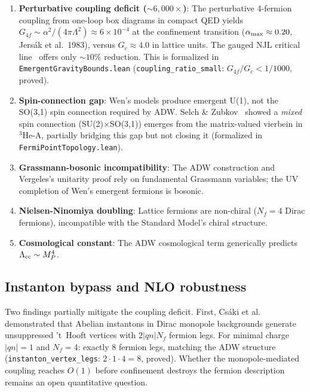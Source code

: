\documentclass[aps,prd,twocolumn,superscriptaddress,nofootinbib]{revtex4-2}
\begin{document}
\begin{enumerate}
\item \textbf{Perturbative coupling deficit (${\sim}6{,}000\times$)}: The
  perturbative 4-fermion coupling from one-loop box diagrams in compact QED
  yields $G_{4f} \sim \alpha^2/(4\pi\Lambda^2) \approx 6 \times 10^{-4}$ at
  the confinement transition ($\alpha_{\rm max} \approx 0.20$,
  Jersák et al.~1983), versus $G_c \approx 4.0$ in lattice units. The gauged
  NJL critical line~\cite{Kondo1989} offers only ${\sim}10\%$ reduction. This is
  formalized in \texttt{EmergentGravityBounds.lean} (\texttt{coupling\_ratio\_small}:
  $G_{4f}/G_c < 1/1000$, proved).

\item \textbf{Spin-connection gap}: Wen's models produce emergent U(1),
  not the SO(3,1) spin connection required by ADW. Selch \& Zubkov~\cite{Selch2025}
  showed a \emph{mixed} spin connection (SU(2)$\times$SO(3,1)) emerges from the
  matrix-valued vierbein in $^3$He-A, partially bridging this gap but not closing it
  (formalized in \texttt{FermiPointTopology.lean}).

\item \textbf{Grassmann-bosonic incompatibility}: The ADW construction and
  Vergeles's unitarity proof rely on fundamental Grassmann variables; the
  UV completion of Wen's emergent fermions is bosonic.

\item \textbf{Nielsen-Ninomiya doubling}: Lattice fermions are non-chiral
  ($N_f = 4$ Dirac fermions), incompatible with the Standard Model's chiral
  structure.

\item \textbf{Cosmological constant}: The ADW cosmological term generically
  predicts $\Lambda_{\rm cc} \sim M_P^4$.
\end{enumerate}

\subsection{Instanton bypass and NLO robustness}

Two findings partially mitigate the coupling deficit. First, Csáki et
al.~\cite{Csaki2024} demonstrated that Abelian instantons in Dirac monopole
backgrounds generate unsuppressed 't~Hooft vertices with $2|qn|N_f$ fermion
legs. For minimal charge $|qn|=1$ and $N_f = 4$: exactly 8 fermion legs,
matching the ADW structure (\texttt{instanton\_vertex\_legs}: $2 \cdot 1 \cdot 4 = 8$, proved).
Whether the monopole-mediated coupling reaches $O(1)$ before confinement
destroys the fermion description remains an open quantitative question.
\end{document}
